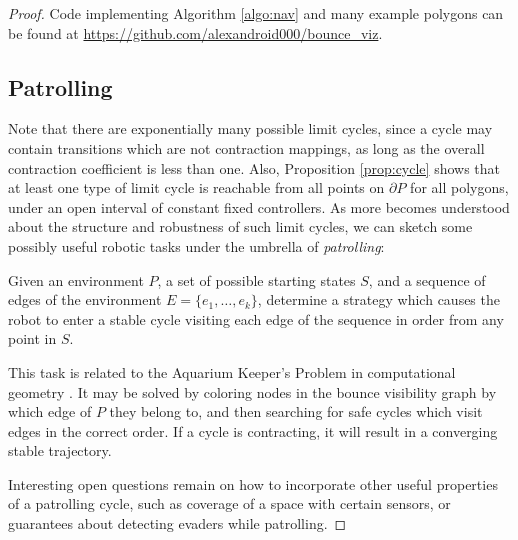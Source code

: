 \documentclass[]{styles/svproc}  %
\begin{document}
\begin{proof}
Code implementing Algorithm \ref{algo:nav} and many example polygons can be
found at \url{https://github.com/alexandroid000/bounce_viz}.



\subsection{Patrolling}

Note that there are
exponentially many possible limit cycles, since a cycle may contain
transitions which are not contraction mappings, as long as the overall
contraction coefficient is less than one. Also, Proposition \ref{prop:cycle}
shows that at least one type of limit cycle is reachable from all points on
$\partial P$ for all polygons, under an open interval of constant fixed
controllers. As more becomes understood about the structure and robustness of
such limit cycles, we can sketch some possibly useful robotic tasks under the
umbrella of {\em patrolling}:

\begin{definition}
Given an environment $P$, a set of possible starting states $S$, and
a sequence of edges of the environment $E = \{e_1, \ldots, e_k\}$,
determine a strategy which causes the robot to enter a stable cycle visiting 
each edge of the sequence in order from any point in $S$.
\end{definition}

This task is related to the Aquarium Keeper's Problem in computational
geometry \cite{czyzowicz1991aquarium}. It may be solved by coloring nodes in the
bounce visibility graph by which edge of $P$ they belong to, and then searching
for safe cycles which visit edges in the correct order. If a cycle is
contracting, it will result in a converging stable trajectory.

Interesting open questions remain on how to incorporate other useful properties of a
patrolling cycle, such as coverage of a space with certain sensors, or guarantees
about detecting evaders while patrolling.


\end{proof}
\end{document}
